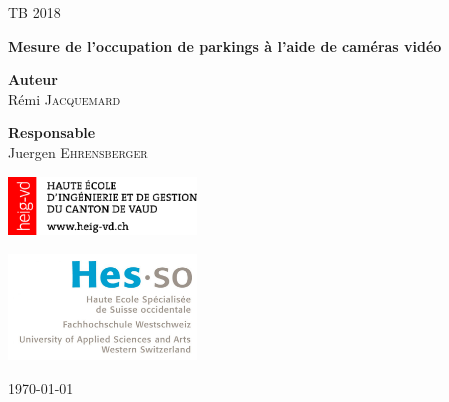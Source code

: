 \begin{titlepage}
    \begin{center}

    \vspace{12cm}

	{\Large TB 2018}\par
	 \vspace{0.5cm}
     {\LARGE \bf Mesure de l'occupation de parkings à l'aide de caméras vidéo}\par
     \vspace{3cm}
     \vfill
        
    \begin{minipage}{0.4\textwidth}
    	\begin{flushleft} \large
            \textbf{Auteur}\\
            Rémi \textsc{Jacquemard}\\
        \end{flushleft}

	\end{minipage}
	\begin{minipage}{0.4\textwidth}
	    \begin{flushright}
            \textbf{Responsable} \\
            Juergen \textsc{Ehrensberger}\\
        \end{flushright}
    \end{minipage}

    
    \vspace{2cm}
    \begin{minipage}{0.4\textwidth}
    	\begin{flushleft} \large
       		\includegraphics[width=5cm]{img/logo_heig.png}
        \end{flushleft}

	\end{minipage}
	\begin{minipage}{0.4\textwidth}
	    \begin{flushright}
			\includegraphics[width=5cm]{img/logo-hes-so.jpg}
		\end{flushright}
	\end{minipage}


        \today
        
    \end{center}
\end{titlepage}
